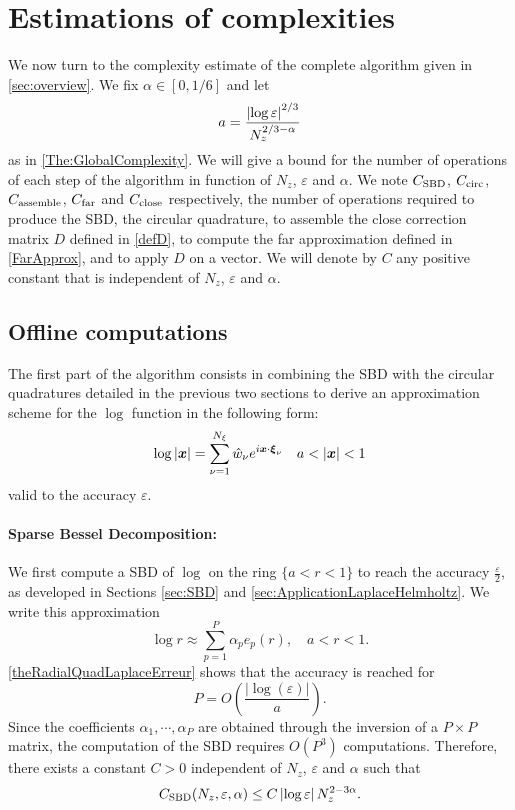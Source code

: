 \documentclass{article}
\begin{document}
	
																																																	
																																																		
\section{Estimations of complexities}
\label{sec:complexities}
We now turn to the complexity estimate of the complete algorithm given in \autoref{sec:overview}. We fix $\alpha \in [0,1/6]$ and let 
\begin{equation}
	\label{def_a}
	a = \dfrac{\left\lvert \log\varepsilon \right\rvert^{2/3}}{N_z^{2/3 - \alpha}}
\end{equation}  
as in \autoref{The:GlobalComplexity}. We will give a bound for the number of operations of each step of the algorithm in function of $N_z$, $\varepsilon$ and $\alpha$. We note  $C_{\textup{SBD}}$, $C_{\textup{circ}}$, $C_{\textup{assemble}}$, $C_{\textup{far}}$ and $C_{\textup{close}}$ respectively, the number of operations required  to produce the SBD, the circular quadrature, to assemble the close correction matrix $D$ defined in \eqref{defD}, to compute the far approximation defined in \eqref{FarApprox}, and to apply $D$ on a vector. We will denote by $C$ any positive constant that is independent of $N_z$, $\varepsilon$ and $\alpha$. 
\subsection{Offline computations}
The first part of the algorithm consists in combining the SBD with the circular quadratures detailed in the previous two sections to derive an approximation scheme for the $\log$ function in the following form: 
\[ \log |\boldsymbol{x}| = \sum_{\nu=1}^{N_\xi} \hat{w}_{\nu} e^{i \boldsymbol{x}\cdot \boldsymbol{\xi}_{\nu}} \quad a < \left\lvert \boldsymbol{x} \right\rvert < 1\]
valid to the accuracy $\varepsilon$.
																																																		
\paragraph{Sparse Bessel Decomposition:}
We first compute a SBD of $\log$ on the ring $\{a < r < 1\}$ to reach the accuracy $\frac{\varepsilon}{2}$, as  developed in Sections \ref{sec:SBD} and \ref{sec:ApplicationLaplaceHelmholtz}. We write this approximation
\[ \log r \approx \sum_{p=1}^P \alpha_p e_p(r), \quad a < r < 1.\]
\autoref{theRadialQuadLaplaceErreur} shows that the accuracy is reached for 
\begin{equation}
	\label{eq:valeurDePenFonctionDe_a}
	P = O\left(\dfrac{|\log(\varepsilon)|}{a}\right).
\end{equation}
Since the coefficients $\alpha_1,\cdots,\alpha_P$ are obtained through the inversion of a $P \times P$ matrix, the computation of the SBD requires $O(P^3)$ computations. Therefore, there exists a constant $C>0$ independent of $N_z$, $\varepsilon$ and $\alpha$ such that 
\begin{equation}
	\label{Complex:SBD}
	C_{\textup{SBD}}(N_z,\varepsilon,\alpha) \leq C \left\lvert \log\varepsilon \right\rvert N_z^{2 - 3\alpha}.
\end{equation}
																																																		
\end{document}
